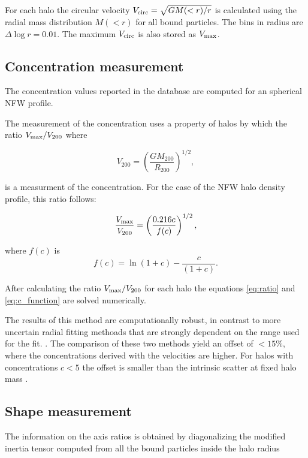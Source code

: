 For each halo the circular velocity $V_{\rm circ}=\sqrt{GM(<r)/r}$ is
calculated using  the radial mass distribution $M(<r)$ for all bound
particles. The bins in radius are $\Delta \log r=0.01$. The maximum
$V_{\rm circ}$ is also stored as $V_{\rm max}$.

\subsection{Concentration measurement}


The concentration values reported in the database are computed for an
spherical NFW profile.  

The measurement of the concentration uses a property of halos by which
the ratio $V_{\rm max}/V_{\rm 200}$ where

\begin{equation}
V_{200} = \left(\frac{GM_{200}}{R_{200}}\right)^{1/2},
\end{equation}

is a measurment of the concentration. For the case of the NFW halo
density profile, this ratio follows:

\begin{equation}
\frac{V_{\rm max}}{V_{\rm 200}} = \left(\frac{0.216
  c}{f(c)}\right)^{1/2}, 
\label{eq:ratio}
\end{equation}

where $f(c)$ is
\begin{equation}
f(c) = \ln(1+c) - \frac{c}{(1+c)}.
\label{eq:c_function}
\end{equation}

After calculating the ratio $V_{\rm max}/V_{\rm 200}$ for each halo
the equations \ref{eq:ratio} and \ref{eq:c_function} are solved
numerically. 

The results of this method are computationally robust, in contrast to
more uncertain radial fitting methoads that are strongly dependent on
the range used for the fit. \citep{Klypin:2010qw,Meneghetti2013}. The
comparison of these two methods yield an offset of $<15\%$, where the
concentrations derived with the velocities are
higher. For halos with concentrations $c<5$ the offset is smaller than
the intrinsic scatter at fixed halo mass \citep{Prada2012}.

\subsection{Shape measurement}
The information on the axis ratios is obtained by diagonalizing the
modified inertia tensor computed from all the bound particles inside
the halo radius

